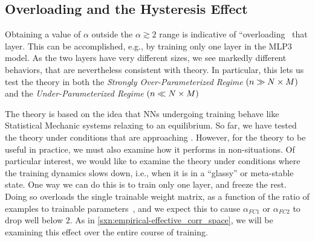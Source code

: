 
\subsection{Overloading and the Hysteresis Effect}
\label{sxn:hysteresis_effect}
Obtaining a value of $\alpha$ outside the $\alpha \gtrsim 2$ range is indicative of ``overloading~\cite{SST92} that layer. 
This can be accomplished, e.g., by training only one layer in the MLP3 model.
As the two layers have very different sizes, we see markedly different behaviors, that are nevertheless consistent with theory.
In particular, this lets us test the theory in both the \emph{Strongly Over-Parameterized Regime} $(n \gg N\times M)$ 
and the \emph{Under-Parameterized Regime} $(n \ll N \times M)$ 

The \SETOL theory is based on the idea that NNs undergoing training behave like Statistical Mechanic systems relaxing to an equilibrium. 
So far, we have tested the theory under conditions that are approaching \Ideal. 
However, for the theory to be useful in practice, we must also examine how it performs in non-\Ideal situations. 
Of particular interest, we would like to examine the theory under conditions where the training dynamics slows down, i.e., when it is in a ``glassy''
or meta-stable state. 
One way we can do this is to train only one layer, and freeze the rest. 
Doing so overloads the single trainable weight matrix, as a function of the ratio of examples to trainable
parameters~\cite{SST92,Gardner_1988,MM17_TR}, and we expect this to cause $\alpha_{FC1}$ or $\alpha_{FC2}$ to drop well below $2$. As in \ref{sxn:empirical-effective_corr_space}, we will be examining this effect over the entire course of training.

